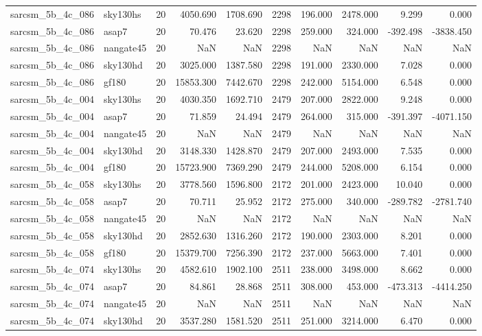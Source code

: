 \begin{longtable}{llrrrrrrrr}
sarcsm\_5b\_4c\_086 & sky130hs & 20 & 4050.690 & 1708.690 & 2298 & 196.000 & 2478.000 & 9.299 & 0.000 \\
sarcsm\_5b\_4c\_086 & asap7 & 20 & 70.476 & 23.620 & 2298 & 259.000 & 324.000 & -392.498 & -3838.450 \\
sarcsm\_5b\_4c\_086 & nangate45 & 20 & NaN & NaN & 2298 & NaN & NaN & NaN & NaN \\
sarcsm\_5b\_4c\_086 & sky130hd & 20 & 3025.000 & 1387.580 & 2298 & 191.000 & 2330.000 & 7.028 & 0.000 \\
sarcsm\_5b\_4c\_086 & gf180 & 20 & 15853.300 & 7442.670 & 2298 & 242.000 & 5154.000 & 6.548 & 0.000 \\
sarcsm\_5b\_4c\_004 & sky130hs & 20 & 4030.350 & 1692.710 & 2479 & 207.000 & 2822.000 & 9.248 & 0.000 \\
sarcsm\_5b\_4c\_004 & asap7 & 20 & 71.859 & 24.494 & 2479 & 264.000 & 315.000 & -391.397 & -4071.150 \\
sarcsm\_5b\_4c\_004 & nangate45 & 20 & NaN & NaN & 2479 & NaN & NaN & NaN & NaN \\
sarcsm\_5b\_4c\_004 & sky130hd & 20 & 3148.330 & 1428.870 & 2479 & 207.000 & 2493.000 & 7.535 & 0.000 \\
sarcsm\_5b\_4c\_004 & gf180 & 20 & 15723.900 & 7369.290 & 2479 & 244.000 & 5208.000 & 6.154 & 0.000 \\
sarcsm\_5b\_4c\_058 & sky130hs & 20 & 3778.560 & 1596.800 & 2172 & 201.000 & 2423.000 & 10.040 & 0.000 \\
sarcsm\_5b\_4c\_058 & asap7 & 20 & 70.711 & 25.952 & 2172 & 275.000 & 340.000 & -289.782 & -2781.740 \\
sarcsm\_5b\_4c\_058 & nangate45 & 20 & NaN & NaN & 2172 & NaN & NaN & NaN & NaN \\
sarcsm\_5b\_4c\_058 & sky130hd & 20 & 2852.630 & 1316.260 & 2172 & 190.000 & 2303.000 & 8.201 & 0.000 \\
sarcsm\_5b\_4c\_058 & gf180 & 20 & 15379.700 & 7256.390 & 2172 & 237.000 & 5663.000 & 7.401 & 0.000 \\
sarcsm\_5b\_4c\_074 & sky130hs & 20 & 4582.610 & 1902.100 & 2511 & 238.000 & 3498.000 & 8.662 & 0.000 \\
sarcsm\_5b\_4c\_074 & asap7 & 20 & 84.861 & 28.868 & 2511 & 308.000 & 453.000 & -473.313 & -4414.250 \\
sarcsm\_5b\_4c\_074 & nangate45 & 20 & NaN & NaN & 2511 & NaN & NaN & NaN & NaN \\
sarcsm\_5b\_4c\_074 & sky130hd & 20 & 3537.280 & 1581.520 & 2511 & 251.000 & 3214.000 & 6.470 & 0.000 \\

\end{longtable}
